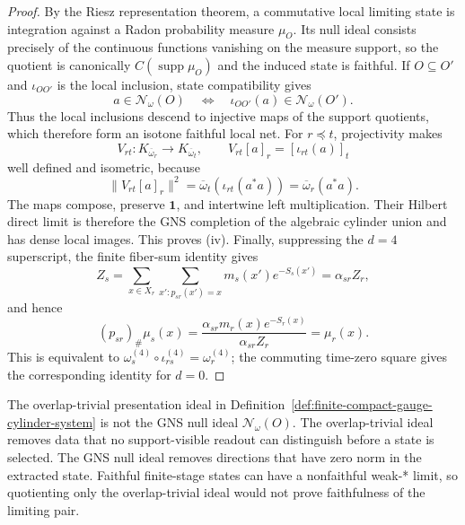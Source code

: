 \begin{proof}
By the Riesz representation theorem, a commutative local limiting state is integration against a
Radon probability measure \(\mu_O\). Its null ideal consists precisely of the continuous functions
vanishing on the measure support, so the quotient is canonically \(C(\operatorname{supp}\mu_O)\)
and the induced state is faithful. If \(O\subseteq O'\) and \(\iota_{OO'}\) is the local
inclusion, state compatibility gives
\[
a\in\mathcal N_\omega(O)
\quad\Longleftrightarrow\quad
\iota_{OO'}(a)\in\mathcal N_\omega(O').
\]
Thus the local inclusions descend to injective maps of the support quotients, which therefore form
an isotone faithful local net. For \(r\preceq t\), projectivity makes
\[
V_{rt}:K_{\overline\omega_r}\longrightarrow K_{\overline\omega_t},
\qquad
V_{rt}[a]_r=[\iota_{rt}(a)]_t
\]
well defined and isometric, because
\[
\|V_{rt}[a]_r\|^2
=\overline\omega_t(\iota_{rt}(a^*a))
=\overline\omega_r(a^*a).
\]
The maps compose, preserve \(\mathbf 1\), and intertwine left multiplication. Their Hilbert
direct limit is therefore the GNS completion of the algebraic cylinder union and has dense local
images. This proves \textup{(iv)}. Finally, suppressing the \(d=4\) superscript, the finite
fiber-sum identity gives
\[
Z_s=\sum_{x\in X_r}\sum_{x':p_{sr}(x')=x}m_s(x')e^{-S_s(x')}
=\alpha_{sr}Z_r,
\]
and hence
\[
(p_{sr})_\#\mu_s(x)
=\frac{\alpha_{sr}m_r(x)e^{-S_r(x)}}{\alpha_{sr}Z_r}
=\mu_r(x).
\]
This is equivalent to \(\omega_s^{(4)}\circ\iota_{rs}^{(4)}=\omega_r^{(4)}\); the commuting
time-zero square gives the corresponding identity for \(d=0\).
\end{proof}

\begin{remark}
\label{rem:compact-gauge-two-quotients}
The overlap-trivial presentation ideal in
Definition~\ref{def:finite-compact-gauge-cylinder-system} is not the GNS null ideal
\(\mathcal N_\omega(O)\). The overlap-trivial ideal removes data that no support-visible readout can
distinguish before a state is selected. The GNS null ideal removes directions that have zero norm
in the extracted state. Faithful finite-stage states can have a nonfaithful weak-* limit, so quotienting only the
overlap-trivial ideal would not prove faithfulness of the limiting pair.
\end{remark}

